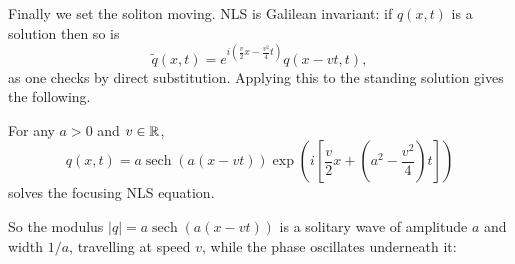 \documentclass[a4paper]{scrartcl}
\DeclareMathOperator{\sech}{sech}
\begin{document}
Finally we set the soliton moving. NLS is Galilean invariant: if $q(x,t)$ is a solution then so is
$$
\tilde q(x,t) = e^{i\left(\frac{v}{2}x - \frac{v^2}{4}t\right)}q(x - vt, t),
$$
as one checks by direct substitution. Applying this to the standing solution gives the following.

\begin{proposition}
	For any $a > 0$ and $v\in\mathbb{R}$,
	$$
	q(x,t) = a\sech\left(a(x-vt)\right)\exp\left(i\left[\frac{v}{2}x + \left(a^2 - \frac{v^2}{4}\right)t\right]\right)
	$$
	solves the focusing NLS equation.
\end{proposition}

So the modulus $|q| = a\sech(a(x-vt))$ is a solitary wave of amplitude $a$ and width $1/a$, travelling at speed $v$, while the phase oscillates underneath it:
\begin{center}
\end{center}
\end{document}
